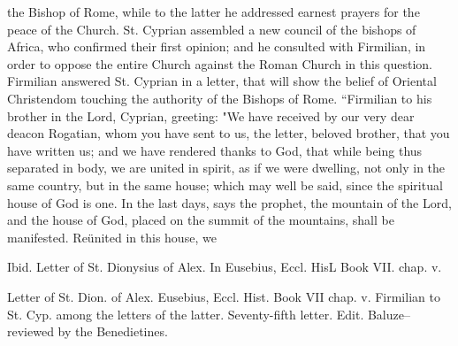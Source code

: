 the Bishop of Rome, while to the latter he addressed earnest prayers for the peace of the Church. St. Cyprian assembled a new council of the bishops of Africa, who confirmed their first opinion; and he consulted with Firmilian, in order to oppose the entire Church against the Roman Church in this question. Firmilian answered St. Cyprian in a letter, that will show the belief of Oriental Christendom touching the authority of the Bishops of Rome. “Firmilian to his brother in the Lord, Cyprian, greeting: "We have received by our very dear deacon Rogatian, whom you have sent to us, the letter, beloved brother, that you have written us; and we have rendered thanks to God, that while being thus separated in body, we are united in spirit, as if we were dwelling, not only in the same country, but in the same house; which may well be said, since the spiritual house of God is one. In the last days, says the prophet, the mountain of the Lord, and the house of God, placed on the summit of the mountains, shall be manifested. Reünited in this house, we

Ibid. Letter of St. Dionysius of Alex. In Eusebius, Eccl. HisL Book VII. chap. v.

Letter of St. Dion. of Alex. Eusebius, Eccl. Hist. Book VII chap. v. Firmilian to St. Cyp. among the letters of the latter. Seventy-fifth letter. Edit. Baluze--reviewed by the Benedietines.

